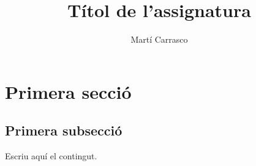 \documentclass[a4paper]{article}
\title{Títol de l'assignatura}
\author{Martí Carrasco}
\date{}
\begin{document}
\maketitle

\section{Primera secció}
\subsection{Primera subsecció}

\begin{definicio}
Escriu aquí el contingut.
\end{definicio}
\end{document}
